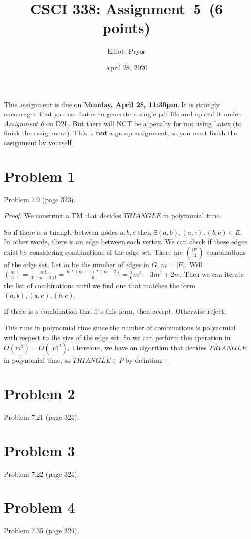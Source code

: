 \documentclass[11pt]{article}
\begin{document}
\date{April 28, 2020}
\title{CSCI 338: Assignment~5~(6 points)}

\author{Elliott Pryor}


\maketitle

\noindent
This assignment is due on {\bf Monday, April 28, 11:30pm}. It is strongly
encouraged that you use Latex to generate a single pdf file and upload it
under {\em Assignment 6} on D2L. But there will NOT be a penalty for not
using Latex (to finish the assignment). This is {\bf not} a group-assignment,
so you must finish the assignment by yourself.

\section*{Problem 1}

Problem 7.9 (page 323).
\newline


\begin{proof}


We construct a TM that decides $TRIANGLE$ in polynomial time. 

So if there is a triangle between nodes $a, b, c$ then $\exists (a, b), (a,c), (b, c) \in E$. In other words, there is an edge between each vertex. We can check if these edges exist by considering combinations of the edge set. There are ${|E| \choose 3}$ combinations of the edge set. Let $m$ be the number of edges in $G$, $m = |E|$.  Well ${m \choose 3 } = \frac{m!}{3! (m - 3)!} = \frac{m * (m-1) * (m-2)}{6} = \frac{1}{6} m^3 - 3m^2 + 2m$. Then we can iterate the list of combinations until we find one that matches the form $(a, b), (a,c), (b, c)$. 

If there is a combination that fits this form, then accept. Otherwise reject.

This runs in polynomial time since the number of combinations is polynomial with respect to the size of the edge set. So we can perform this operation in $O(m^3) = O(|E|^3)$. Therefore, we have an algorithm that decides $TRIANGLE$ in polynomial time, so $TRIANGLE \in P$ by defintion.

\end{proof}


\section*{Problem 2}

Problem 7.21 (page 324).
\newline

\section*{Problem 3}

Problem 7.22 (page 324).
\newline

\section*{Problem 4}

Problem 7.35 (page 326).
\end{document}
